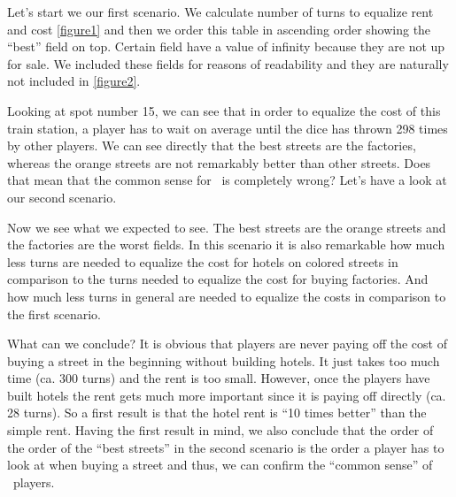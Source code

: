 Let's start we our first scenario. We calculate number of turns to equalize rent and cost \ref{figure1} 
and then we order this table in ascending order showing the ``best'' field on top. 
Certain field have a value of infinity because they are not up for sale. We included these fields for 
reasons of readability and they are naturally not included in \ref{figure2}.


Looking at spot number 15, we can see that in order to equalize the cost of this train station, a player 
has to wait on average until the dice has thrown 298 times by other players.
We can see directly that the best streets are the factories, whereas the orange streets are not remarkably 
better than other streets. Does that mean that the common sense for \monopoly~is completely wrong?
Let's have a look at our second scenario.


Now we see what we expected to see. The best streets are the orange streets and the factories are the worst 
fields. In this scenario it is also remarkable how much less turns are needed to equalize the cost for 
hotels on colored streets in comparison to the turns needed to equalize the cost for buying factories. And 
how much less turns in general are needed to equalize the costs in comparison to the first scenario.

What can we conclude? 
It is obvious that players are never paying off the cost of buying a street in the beginning without 
building hotels. It just takes too much time (ca. 300 turns) and the rent is too small. However, once the 
players have built hotels the rent gets much more important since it is paying off directly (ca. 28 turns). 
So a first result is that the hotel rent is ``10 times better'' than the simple rent.
Having the first result in mind, we also conclude that the order of the order of the ``best streets'' in 
the second scenario is the order a player has to look at when buying a street and thus, we can confirm 
the ``common sense'' of \monopoly~players. 



